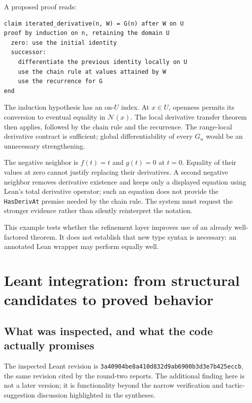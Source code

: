 \documentclass[11pt,a4paper]{article}
\newcommand{\code}[1]{\nolinkurl{#1}}
\theoremstyle{plain}
\theoremstyle{definition}
\theoremstyle{remark}
\begin{document}
A proposed proof reads:
\par\noindent\begin{minipage}{\linewidth}
\begin{lstlisting}
claim iterated_derivative(n, W) = G(n) after W on U
proof by induction on n, retaining the domain U
  zero: use the initial identity
  successor:
    differentiate the previous identity locally on U
    use the chain rule at values attained by W
    use the recurrence for G
end
\end{lstlisting}
\end{minipage}\par

The induction hypothesis has an on-$U$ index. At $x\in U$, openness permits
its conversion to eventual equality in $\mathcal N(x)$. The local derivative
transfer theorem then applies, followed by the chain rule and the recurrence.
The range-local derivative contract is sufficient; global differentiability
of every $G_n$ would be an unnecessary strengthening.

The negative neighbor is $f(t)=t$ and $g(t)=0$ at $t=0$. Equality of their
values at zero cannot justify replacing their derivatives. A second negative
neighbor removes derivative existence and keeps only a displayed equation
using Lean's total derivative operator; such an equation does not provide the
\code{HasDerivAt} premise needed by the chain rule. The system must request
the stronger evidence rather than silently reinterpret the notation.

This example tests whether the refinement layer improves use of an already
well-factored theorem. It does not establish that new type syntax is necessary:
an annotated Lean wrapper may perform equally well.

\section{Leant integration: from structural candidates to proved behavior}
\label{sec:leant}
\subsection{What was inspected, and what the code actually promises}
The inspected Leant revision is
\code{3a40904be8a410d832d9ab6900b3d3e7b425eccb}, the same revision cited by the
round-two reports. The additional finding here is not a later version; it is
functionality beyond the narrow verification and tactic-suggestion discussion
highlighted in the syntheses.
\end{document}
